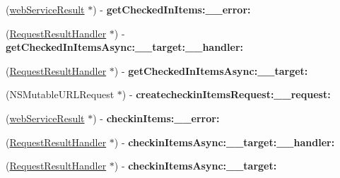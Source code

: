 \begin{DoxyCompactItemize}
\item 
\hypertarget{interface_supply_chain_service_port_binding_a058a5344b4e412b7ec3fbcd9d050d16c}{}(\hyperlink{interfaceweb_service_result}{web\+Service\+Result} $\ast$) -\/ {\bfseries get\+Checked\+In\+Items\+:\+\_\+\+\_\+error\+:}\label{interface_supply_chain_service_port_binding_a058a5344b4e412b7ec3fbcd9d050d16c}

\item 
\hypertarget{interface_supply_chain_service_port_binding_a1c424d6066112d95c47f4433d1f77122}{}(\hyperlink{interface_request_result_handler}{Request\+Result\+Handler} $\ast$) -\/ {\bfseries get\+Checked\+In\+Items\+Async\+:\+\_\+\+\_\+target\+:\+\_\+\+\_\+handler\+:}\label{interface_supply_chain_service_port_binding_a1c424d6066112d95c47f4433d1f77122}

\item 
\hypertarget{interface_supply_chain_service_port_binding_afd7d20955856ce8c23f6a9486494d7fa}{}(\hyperlink{interface_request_result_handler}{Request\+Result\+Handler} $\ast$) -\/ {\bfseries get\+Checked\+In\+Items\+Async\+:\+\_\+\+\_\+target\+:}\label{interface_supply_chain_service_port_binding_afd7d20955856ce8c23f6a9486494d7fa}

\item 
\hypertarget{interface_supply_chain_service_port_binding_a68ddda24216bf1107fbf01aef594d349}{}(N\+S\+Mutable\+U\+R\+L\+Request $\ast$) -\/ {\bfseries createcheckin\+Items\+Request\+:\+\_\+\+\_\+request\+:}\label{interface_supply_chain_service_port_binding_a68ddda24216bf1107fbf01aef594d349}

\item 
\hypertarget{interface_supply_chain_service_port_binding_a9c579cfe2491c44e6816178291f930a9}{}(\hyperlink{interfaceweb_service_result}{web\+Service\+Result} $\ast$) -\/ {\bfseries checkin\+Items\+:\+\_\+\+\_\+error\+:}\label{interface_supply_chain_service_port_binding_a9c579cfe2491c44e6816178291f930a9}

\item 
\hypertarget{interface_supply_chain_service_port_binding_ae19108865a467c71aa1da89bb9d06817}{}(\hyperlink{interface_request_result_handler}{Request\+Result\+Handler} $\ast$) -\/ {\bfseries checkin\+Items\+Async\+:\+\_\+\+\_\+target\+:\+\_\+\+\_\+handler\+:}\label{interface_supply_chain_service_port_binding_ae19108865a467c71aa1da89bb9d06817}

\item 
\hypertarget{interface_supply_chain_service_port_binding_a1b684b1fdd8694ab02a4255dd47a61b8}{}(\hyperlink{interface_request_result_handler}{Request\+Result\+Handler} $\ast$) -\/ {\bfseries checkin\+Items\+Async\+:\+\_\+\+\_\+target\+:}\label{interface_supply_chain_service_port_binding_a1b684b1fdd8694ab02a4255dd47a61b8}


\end{DoxyCompactItemize}
